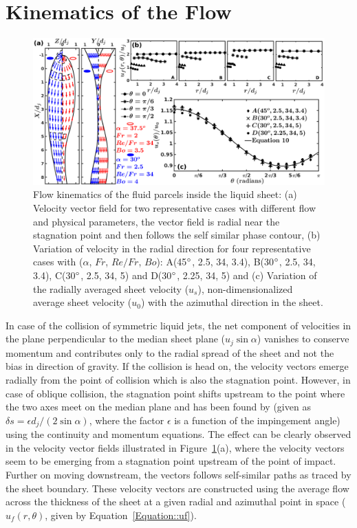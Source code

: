 \documentclass[%
aip,
sd,%
amsmath,amssymb,
preprint,%
author-year,%
]{revtex4-1}
\begin{document}
\section{Kinematics of the Flow}
\begin{figure}
	\centering
	\includegraphics[width=\linewidth]{velocityVectors}
	\caption{Flow kinematics of the fluid parcels inside the liquid sheet: (a) Velocity vector field for two representative cases with different flow and physical parameters, the vector field is radial near the stagnation point and then follows the self similar phase contour, (b) Variation of velocity in the radial direction for four representative cases with ($\alpha$, $Fr$, $Re/Fr$, $Bo$): A(45$\degree$, 2.5, 34, 3.4), B(30$\degree$, 2.5, 34, 3.4), C(30$\degree$, 2.5, 34, 5) and D(30$\degree$, 2.25, 34, 5) and (c) Variation of the radially averaged sheet velocity ($u_s$), non-dimensionalized average sheet velocity ($u_0$) with the azimuthal direction in the sheet.}
	\label{Figure::velocityVectors}
\end{figure}
In case of the collision of symmetric liquid jets, the net component of velocities in the plane perpendicular to the median sheet plane ($u_j\sin\alpha$) vanishes to conserve momentum and contributes only to the radial spread of the sheet and not the bias in direction of gravity. If the collision is head on, the velocity vectors emerge radially from the point of collision which is also the stagnation point. However, in case of oblique collision, the stagnation point shifts upstream to the point where the two axes meet on the median plane \citep{choo2007effect,yang2014liquid} and has been found by \cite{inamura2014effect} (given as $\delta s = \epsilon d_j/(2\sin\alpha)$, where the factor $\epsilon$ is a function of the impingement angle) using the continuity and momentum equations. The effect can be clearly observed in the velocity vector fields illustrated in Figure~\ref{Figure::velocityVectors}(a), where the velocity vectors seem to be emerging from a stagnation point upstream of the point of impact. Further on moving downstream, the vectors follows self-similar paths as traced by the sheet boundary. These velocity vectors are constructed using the average flow across the thickness of the sheet at a given radial and azimuthal point in space ($u_f(r,\theta)$, given by Equation~\ref{Equation::uf}). 
\end{document}
